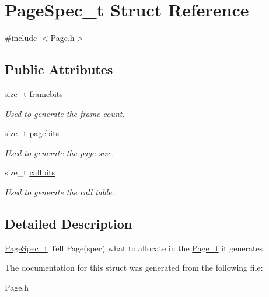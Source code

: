 \hypertarget{struct_page_spec__t}{}\section{Page\+Spec\+\_\+t Struct Reference}
\label{struct_page_spec__t}


{\ttfamily \#include $<$Page.\+h$>$}

\subsection*{Public Attributes}
\begin{DoxyCompactItemize}
\item 
\hypertarget{struct_page_spec__t_a30d3525355cbd36851071d21ca96fff5}{}size\+\_\+t \hyperlink{struct_page_spec__t_a30d3525355cbd36851071d21ca96fff5}{framebits}\label{struct_page_spec__t_a30d3525355cbd36851071d21ca96fff5}

\begin{DoxyCompactList}\small\item\em Used to generate the frame count. \end{DoxyCompactList}\item 
\hypertarget{struct_page_spec__t_a83358365cf5e133ff0d48faa28c2ef52}{}size\+\_\+t \hyperlink{struct_page_spec__t_a83358365cf5e133ff0d48faa28c2ef52}{pagebits}\label{struct_page_spec__t_a83358365cf5e133ff0d48faa28c2ef52}

\begin{DoxyCompactList}\small\item\em Used to generate the page size. \end{DoxyCompactList}\item 
\hypertarget{struct_page_spec__t_a0ed8b6b4f40657a363e433fb18f83ce7}{}size\+\_\+t \hyperlink{struct_page_spec__t_a0ed8b6b4f40657a363e433fb18f83ce7}{callbits}\label{struct_page_spec__t_a0ed8b6b4f40657a363e433fb18f83ce7}

\begin{DoxyCompactList}\small\item\em Used to generate the call table. \end{DoxyCompactList}\end{DoxyCompactItemize}


\subsection{Detailed Description}
\hyperlink{struct_page_spec__t}{Page\+Spec\+\_\+t} Tell Page(spec) what to allocate in the \hyperlink{struct_page__t}{Page\+\_\+t} it generates. 

The documentation for this struct was generated from the following file\+:\begin{DoxyCompactItemize}
\item 
Page.\+h\end{DoxyCompactItemize}
